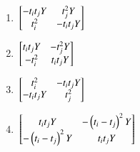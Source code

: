\documentclass[journal]{IEEEtran}
\begin{document}
\begin{enumerate}
\begin{figure}[!ht]
{}%
\end{figure}
\begin{enumerate}
    \item ${}\left[\begin{matrix}
        -t_it_jY & t_j^2Y \\ t_i^2 & -t_it_jY
    \end{matrix}\right]$
     \item ${}\left[\begin{matrix}
        t_it_jY & -t_j^2Y \\ -t_i^2 & t_it_jY
    \end{matrix}\right]$
     \item ${}\left[\begin{matrix}
        t_i^2 & -t_it_jY \\ -t_it_jY & t_j^2
    \end{matrix}\right]$
     \item ${}\left[\begin{matrix}
        t_it_jY & -\left(t_i - t_j\right)^2Y \\ -\left(t_i - t_j\right)^2Y & t_it_jY
    \end{matrix}\right]$
     \end{enumerate}
			 \end{enumerate}
			 
\end{document}
